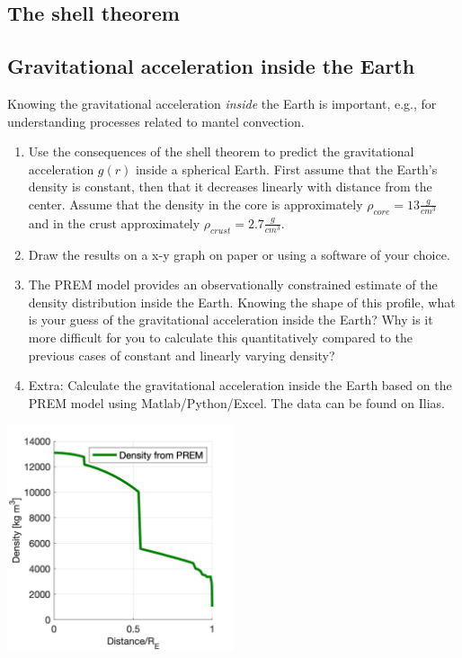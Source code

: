 \documentclass[a4paper,12pt]{article}
\begin{document}
\subsection{The shell theorem}
\label{Sec:Shell{}}
\pagebreak
\subsection{Gravitational acceleration inside the Earth}
Knowing the gravitational acceleration \textit{inside} the Earth is important, e.g., for understanding processes related to mantel convection.
\begin{enumerate}[label=(\alph*)]
  \item Use the consequences of the shell theorem to predict the gravitational acceleration $g(r)$ inside a spherical Earth. First assume that the Earth's density is constant, then that it decreases linearly with distance from the center. Assume that the density in the core is approximately $\rho_{core} = 13 \frac{g}{cm^3}$ and in the crust approximately $\rho_{crust} = 2.7 \frac{g}{cm^3}$.

  \item Draw the results on a x-y graph on paper or using a software of your choice.

  \item The PREM model provides an observationally constrained estimate of the density distribution inside the Earth. Knowing the shape of this profile, what is your guess of the gravitational acceleration inside the Earth? Why is it more difficult for you to calculate this quantitatively compared to the previous cases of constant and linearly varying density?

  \item Extra: Calculate the gravitational acceleration inside the Earth based on the PREM model using Matlab/Python/Excel. The data can be found on Ilias.
\end{enumerate}
\begin{center}
    \includegraphics[width=0.5\textwidth]{Figures/Gravimetry/Gravimetry01_PREM.png}
 \end{center}
\end{document}
